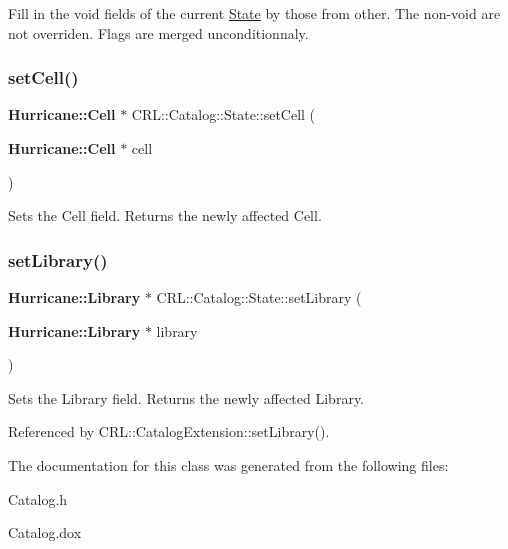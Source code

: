 Fill in the void fields of the current \mbox{\hyperlink{classCRL_1_1Catalog_1_1State}{State}} by those from {\ttfamily other}. The non-\/void are not overriden. Flags are merged unconditionnaly. \mbox{\label{classCRL_1_1Catalog_1_1State_a156714ad3fe2e5bb8ad8549d101526fe}} 
\subsubsection{\texorpdfstring{set\+Cell()}{setCell()}}
{\footnotesize\ttfamily \textbf{ Hurricane\+::\+Cell} $\ast$ C\+R\+L\+::\+Catalog\+::\+State\+::set\+Cell (\begin{DoxyParamCaption}\item[{\textbf{ Hurricane\+::\+Cell} $\ast$}]{cell }\end{DoxyParamCaption})}

Sets the Cell field. Returns the newly affected Cell. \mbox{\label{classCRL_1_1Catalog_1_1State_a821ac2ae33f0045232cab612ab12f84b}} 
\subsubsection{\texorpdfstring{set\+Library()}{setLibrary()}}
{\footnotesize\ttfamily \textbf{ Hurricane\+::\+Library} $\ast$ C\+R\+L\+::\+Catalog\+::\+State\+::set\+Library (\begin{DoxyParamCaption}\item[{\textbf{ Hurricane\+::\+Library} $\ast$}]{library }\end{DoxyParamCaption})\hspace{0.3cm}{\ttfamily [inline]}}

Sets the Library field. Returns the newly affected Library. 

Referenced by C\+R\+L\+::\+Catalog\+Extension\+::set\+Library().



The documentation for this class was generated from the following files\+:\begin{DoxyCompactItemize}
\item 
Catalog.\+h\item 
Catalog.\+dox\end{DoxyCompactItemize}
